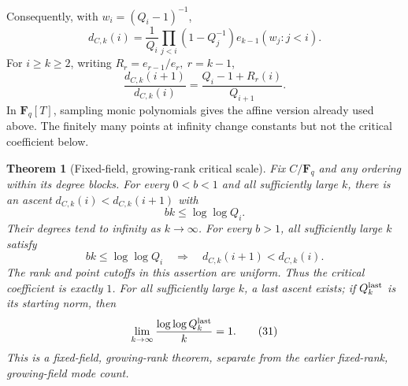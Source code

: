 \documentclass[11pt]{article}
\newtheorem{theorem}{Theorem}[section]
\newcommand{\F}{\mathbf F}
\begin{document}
Consequently, with \(w_i=(Q_i-1)^{-1}\),
\[
 d_{C,k}(i)=\frac1{Q_i}\prod_{j<i}(1-Q_j^{-1})e_{k-1}(w_j:j<i).
\]
For \(i\geq k\geq2\), writing \(R_r=e_{r-1}/e_r,\ r=k-1\),
\[
 \frac{d_{C,k}(i+1)}{d_{C,k}(i)}
      =\frac{Q_i-1+R_r(i)}{Q_{i+1}}.               \tag{30}
\]
In \(\F_q[T]\), sampling monic polynomials gives the affine version
already used above. The finitely many points at infinity change
constants but not the critical coefficient below.

\begin{theorem}[Fixed-field, growing-rank critical scale]
\label{thm:fixedFieldCritical}
Fix \(C/\F_q\) and any ordering within its degree blocks.
For every \(0<b<1\) and all sufficiently large \(k\), there is
an ascent \(d_{C,k}(i)<d_{C,k}(i+1)\) with
\[
                         b k\leq\log\log Q_i.
\]
Their degrees tend to infinity as \(k\to\infty\).
For every \(b>1\), all sufficiently large \(k\) satisfy
\[
 b k\leq\log\log Q_i
       \quad\Longrightarrow\quad
 d_{C,k}(i+1)<d_{C,k}(i).
\]
The rank and point cutoffs in this assertion are uniform.
Thus the critical coefficient is exactly \(1\).
For all sufficiently large \(k\), a last ascent exists; if \(Q_k^{\rm last}\)
is its starting norm, then
\[
                 \lim_{k\to\infty}
                    \frac{\log\log Q_k^{\rm last}}k=1.          \tag{31}
\]
This is a fixed-field, growing-rank theorem, separate from the earlier
fixed-rank, growing-field mode count.
\end{theorem}
\end{document}
